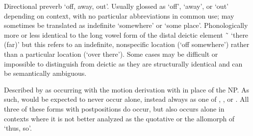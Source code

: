 \begin{morphdesc}[resume*=alphalist]
\item[yóo=]\label{m:yóo=away}
	Directional preverb ‘off, away, out’.
	Usually glossed as ‘off’, ‘away’, or ‘out’ depending on context, with no particular
		abbreviations in common use;
		may sometimes be translated as indefinite ‘somewhere’ or ‘some place’.
	Phonologically more or less identical to the long vowel form
		of the distal deictic element  \~\  ‘there (far)’
		but this  refers to an indefinite, nonspecific location
		(‘off somewhere’)
		rather than a particular location
		(‘over there’).
	Some cases may be difficult or impossible to distinguish from deictic 
		as they are structurally identical and can be semantically ambiguous.
	
	Described by \textcite[133, 138, 147, 299]{leer:1991} as occurring
		with the motion derivation
		with  in place of the NP.
	As such,  would be expected to never occur alone, instead always
		as one of , , or .
	All three of these forms with postpositions do occur,
		but  also occurs alone
		in contexts where it is not better analyzed
		as the quotative 
		or the  allomorph of  ‘thus, so’.


\end{morphdesc}
